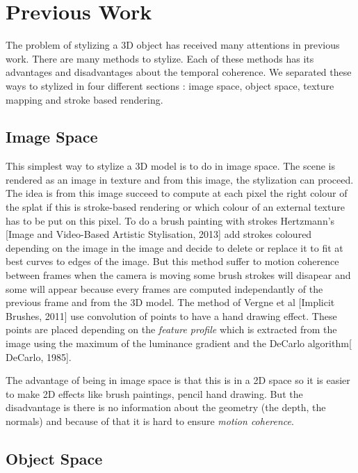 \chapter{Previous Work}



The problem of stylizing a 3D object has received many attentions in previous work. There are many methods to stylize. Each of these methods has its advantages and disadvantages about the temporal coherence. We separated these ways to stylized in four different sections : image space, object space, texture mapping and stroke based rendering.


\section{Image Space}

This simplest way to stylize a 3D model is to do in image space. The scene is rendered as an image in texture and from this image, the stylization can proceed. The idea is from this image succeed to compute at each pixel the right colour of the splat if this is stroke-based rendering or which colour of an external texture has to be put on this pixel. To do a brush painting with strokes Hertzmann's [Image and Video-Based Artistic Stylisation, 2013] add strokes coloured depending on the image in the image and decide to delete or replace it to fit at best curves to edges of the image. But this method suffer to motion coherence between frames when the camera is moving some brush strokes will disapear and some will appear because every frames are computed independantly of the previous frame and from the 3D model. The method of Vergne et al [Implicit Brushes, 2011] use convolution of points to have a hand drawing effect. These points are placed depending on the \textit{feature profile} which is extracted from the image using the maximum of the luminance gradient and the DeCarlo algorithm[ DeCarlo, 1985].

The advantage of being in image space is that this is in a 2D space so it is easier to make 2D effects like brush paintings, pencil hand drawing. But the disadvantage is there is no information about the geometry (the depth, the normals) and because of that it is hard to ensure \textit{motion coherence}.

\section{Object Space}

